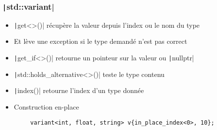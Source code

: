 \documentclass[C++.tex]{subfiles}
\begin{document}
\begin{frame}[fragile]
	\frametitle{\texttt|std::variant|}
	\begin{itemize}
		\item \texttt|get<>()| récupère la valeur depuis l'index ou le nom du type
		\item Et lève une exception si le type demandé n'est pas correct
		\item \texttt|get_if<>()| retourne un pointeur sur la valeur ou \texttt|nullptr|
		\item \texttt|std::holds_alternative<>()| teste le type contenu
		\item \texttt|index()| retourne l'index d'un type donnée
		\item Construction en-place
	\end{itemize}

	\begin{verbatim}
		variant<int, float, string> v{in_place_index<0>, 10};
	\end{verbatim}

\end{frame}
\end{document}
